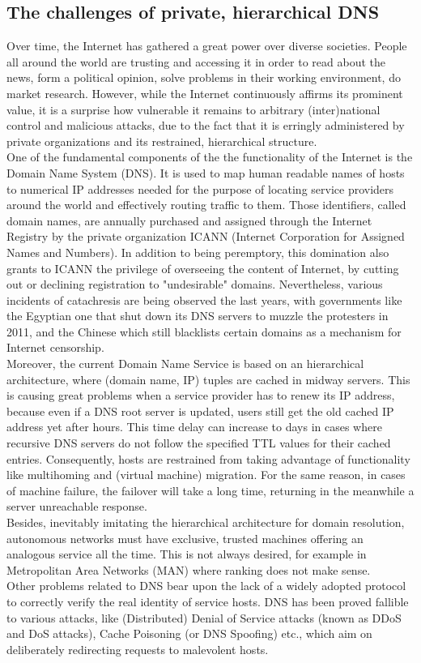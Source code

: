 \documentclass[12pt,a4paper,oneside]{article}
\begin{document}
\newpage
\subsection{The challenges of private, hierarchical DNS}
Over time, the Internet has gathered a great power over diverse societies. People all around the world are trusting and accessing it in order to read about the news, form a political opinion, solve problems in their working environment, do market research. However, while the Internet continuously affirms its prominent value, it is a surprise how vulnerable it remains to arbitrary (inter)national control and malicious attacks, due to the fact that it is erringly administered by private organizations and its restrained, hierarchical structure. \\
\indent One of the fundamental components of the the functionality of the Internet is the Domain Name System (DNS). It is used to map human readable names of hosts to numerical IP addresses needed for the purpose of locating service providers around the world and effectively routing traffic to them. Those identifiers, called domain names, are annually purchased and assigned through the Internet Registry by the private organization ICANN (Internet Corporation for Assigned Names and Numbers). In addition to being peremptory, this domination also grants to ICANN the privilege of overseeing the content of Internet, by cutting out or declining registration to "undesirable" domains. Nevertheless, various incidents of catachresis are being observed the last years, with governments like the Egyptian one that shut down its DNS servers to muzzle the protesters in 2011, and the Chinese which still blacklists certain domains as a mechanism for Internet censorship.\\
\indent Moreover, the current Domain Name Service is based on an hierarchical architecture, where (domain name, IP) tuples are cached in midway servers. This is causing great problems when a service provider has to renew its IP address, because even if a DNS root server is updated, users still get the old cached IP address yet after hours. This time delay can increase to days in cases where recursive DNS servers do not follow the specified TTL values for their cached entries. Consequently, hosts are restrained from taking advantage of functionality like multihoming and (virtual machine) migration. For the same reason, in cases of machine failure, the failover will take a long time, returning in the meanwhile a server unreachable response. \\
\indent Besides, inevitably imitating the hierarchical architecture for domain resolution, autonomous networks must have exclusive, trusted machines offering an analogous service all the time. This is not always desired, for example in Metropolitan Area Networks (MAN) where ranking does not make sense.\\
\indent Other problems related to DNS bear upon the lack of a widely adopted protocol to correctly verify the real identity of service hosts. DNS has been proved fallible to various attacks, like (Distributed) Denial of Service attacks (known as DDoS and DoS attacks), Cache Poisoning (or DNS Spoofing) etc., which aim on deliberately redirecting requests to malevolent hosts.
\end{document}
